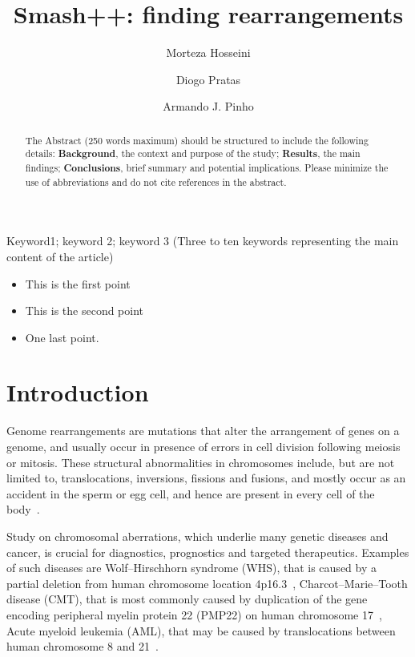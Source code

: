 \documentclass[a4paper,num-refs]{oup-contemporary}
\title{Smash++: finding rearrangements}
\author[1,\authfn{1}]{Morteza Hosseini}
\author[2,\authfn{1}]{Diogo Pratas}
\author[2,\authfn{1}]{Armando J. Pinho}
\affil[1,2]{IEETA/DETI, University of Aveiro, Portugal}
\begin{document}
\begin{frontmatter}
\maketitle
\begin{abstract}
The Abstract (250 words maximum) should be structured to include the following details: \textbf{Background}, the context and purpose of the study; \textbf{Results}, the main findings; \textbf{Conclusions}, brief summary and potential implications. Please minimize the use of abbreviations and do not cite references in the abstract.
\end{abstract}

\begin{keywords}
Keyword1; keyword 2; keyword 3 (Three to ten keywords representing the main content of the article)
\end{keywords}
\end{frontmatter}

\begin{keypoints*}
\begin{itemize}
\item This is the first point
\item This is the second point
\item One last point.
\end{itemize}
\end{keypoints*}

\section{Introduction}
Genome rearrangements are mutations that alter the arrangement of genes on a genome, and usually occur in presence of errors in cell division following meiosis or mitosis.
These structural abnormalities in chromosomes include, but are not limited to, translocations, inversions, fissions and fusions, and mostly occur as an accident in the sperm or egg cell, and hence are present in every cell of the body~\cite{hartmann2018genome,gardner2018gardner}.

Study on chromosomal aberrations, which underlie many genetic diseases and cancer, is crucial for diagnostics, prognostics and targeted therapeutics. Examples of such diseases are Wolf–Hirschhorn syndrome (WHS), that is caused by a partial deletion from human chromosome location 4p16.3~\cite{dufke2000microdeletion}, Charcot–Marie–Tooth disease (CMT), that is most commonly caused by duplication of the gene encoding peripheral myelin protein 22 (PMP22) on human chromosome 17~\cite{timmerman1992peripheral}, Acute myeloid leukemia (AML), that may be caused by translocations between human chromosome 8 and 21~\cite{huang2006acute}.
\end{document}
